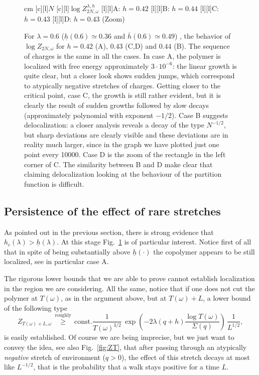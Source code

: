 \documentclass[reqno,11pt]{amsart}
\numberwithin{equation}{section}
\newcommand{\go}{\omega}
\newcommand{\gl}{\lambda}
\begin{document}
\begin{figure}[h]
\begin{center}
\leavevmode
{} cm
\psfragscanon
{}[c][l]{\small $N$}
[c][l]{\small $\log  Z_{2N, \go}^{\gl, h}$}
[l][l]{A: $h=0.42$}
[l][l]{B:  $h=0.44$}
[l][l]{C:  $h=0.43$}
[l][l]{D:  $h=0.43$ (Zoom)}
\end{center}
\caption{
\label{fig:tmp}
For $\gl=0.6$ ($\underline h (0.6)\simeq 0.36$ and $\overline h (0.6)\simeq 0.49$) , the behavior of
$\log Z_{2N, \go}$ for $h=0.42$ (A), $0.43$ (C,D) and $0.44$ (B). The sequence
of charges is the same in all the cases.
In case A, the polymer is localized with free energy approximately
$3\cdot 10^{-6}$: the linear growth is quite clear, but a closer look shows sudden jumps,
which correspond to atypically negative stretches of charges.
Getting closer to the critical point, case C, the growth is still rather evident, but
it is clearly the result of sudden growths followed by slow decays (approximately polynomial
with exponent $-1/2$).  Case B suggests delocalization: a closer analysis reveals a decay
of the type $N ^{-1/2}$, but sharp deviations are clearly visible and these deviations
are in reality much larger, since in the graph we have plotted just one point every 10000.
Case D is the zoom of the rectangle in the left corner of C.
The similarity between B and D
 make clear that claiming delocalization looking at the behaviour of the partition function is difficult.
}
\end{figure}



\subsection{Persistence of the effect of rare stretches}
As pointed out in the previous section, there is strong evidence
that $h_c(\gl)> \underline{h} (\gl)$.
At this stage Fig.~\ref{fig:tmp}  is of particular interest.
Notice first of all that in spite of being substantially above $\underline{h}(\cdot)$
the copolymer appears to be still localized, see in particular case A.




The rigorous lower bounds that we are able
to prove cannot establish localization in the region we are considering.
All the same, notice that if one does  not cut the polymer at $T(\go)$,
as in the argument above, but at $T(\go)+L$,
a  lower bound of the following type
\begin{equation}
\label{eq:beyondT}
Z_{T(\go)+L, \go}\, \stackrel{\text{roughly}}{\ge}\,
\text{const.} \frac1{T(\go)^{3/2}}\,
\exp\left( -2\gl (q+h)\frac{\log T(\go)}{\Sigma (q)}\right) \, \frac 1 {L^{1/2}},
\end{equation}
is easily established. Of course we are being imprecise, but we just want to convey
the idea, see also Fig.~\ref{fig:ZT}, that after passing through an atypically {\sl negative}
stretch of environment ($q>0$), the effect of this stretch decays at most like $L^{-1/2}$,
that is the probability that a walk stays  positive for a time $L$.
\end{document}
